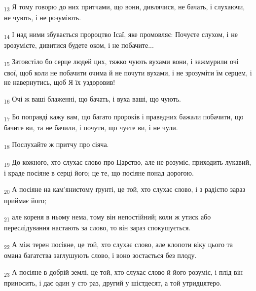 \begin{tcolorbox}
\textsubscript{13} Я тому говорю до них притчами, що вони, дивлячися, не бачать, і слухаючи, не чують, і не розуміють.
\end{tcolorbox}
\begin{tcolorbox}
\textsubscript{14} І над ними збувається пророцтво Ісаї, яке промовляє: Почуєте слухом, і не зрозумієте, дивитися будете оком, і не побачите...
\end{tcolorbox}
\begin{tcolorbox}
\textsubscript{15} Затовстіло бо серце людей цих, тяжко чують вухами вони, і зажмурили очі свої, щоб коли не побачити очима й не почути вухами, і не зрозуміти їм серцем, і не навернутись, щоб Я їх уздоровив!
\end{tcolorbox}
\begin{tcolorbox}
\textsubscript{16} Очі ж ваші блаженні, що бачать, і вуха ваші, що чують.
\end{tcolorbox}
\begin{tcolorbox}
\textsubscript{17} Бо поправді кажу вам, що багато пророків і праведних бажали побачити, що бачите ви, та не бачили, і почути, що чуєте ви, і не чули.
\end{tcolorbox}
\begin{tcolorbox}
\textsubscript{18} Послухайте ж притчу про сіяча.
\end{tcolorbox}
\begin{tcolorbox}
\textsubscript{19} До кожного, хто слухає слово про Царство, але не розуміє, приходить лукавий, і краде посіяне в серці його; це те, що посіяне понад дорогою.
\end{tcolorbox}
\begin{tcolorbox}
\textsubscript{20} А посіяне на кам'янистому ґрунті, це той, хто слухає слово, і з радістю зараз приймає його;
\end{tcolorbox}
\begin{tcolorbox}
\textsubscript{21} але кореня в ньому нема, тому він непостійний; коли ж утиск або переслідування настають за слово, то він зараз спокушується.
\end{tcolorbox}
\begin{tcolorbox}
\textsubscript{22} А між терен посіяне, це той, хто слухає слово, але клопоти віку цього та омана багатства заглушують слово, і воно зостається без плоду.
\end{tcolorbox}
\begin{tcolorbox}
\textsubscript{23} А посіяне в добрій землі, це той, хто слухає слово й його розуміє, і плід він приносить, і дає один у сто раз, другий у шістдесят, а той утридцятеро.
\end{tcolorbox}

